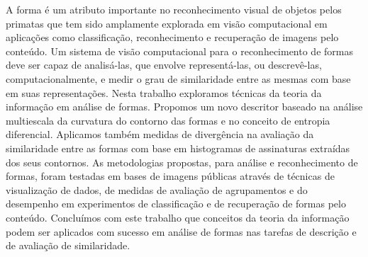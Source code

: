 A forma é um atributo importante no reconhecimento visual de objetos pelos primatas que tem sido amplamente explorada em visão computacional em aplicações como classificação, reconhecimento e recuperação de imagens pelo conteúdo. Um sistema de visão computacional para o reconhecimento de formas deve ser capaz de analisá-las, que envolve representá-las, ou descrevê-las, computacionalmente, e medir o grau de similaridade entre as mesmas com base em suas representações. Nesta trabalho exploramos técnicas da teoria da informação em análise de formas. Propomos um novo descritor baseado na análise multiescala da curvatura do contorno das formas e no conceito de entropia diferencial. Aplicamos também medidas de divergência na avaliação da similaridade entre as formas com base em histogramas de assinaturas extraídas dos seus contornos. As metodologias propostas, para análise e reconhecimento de formas, foram testadas em bases de imagens públicas através de técnicas de visualização de dados, de medidas de avaliação de agrupamentos e do desempenho em experimentos de classificação e de recuperação de formas pelo conteúdo. Concluímos com este trabalho que conceitos da teoria da informação podem ser aplicados com sucesso em análise de formas nas tarefas de descrição e de avaliação de similaridade.
